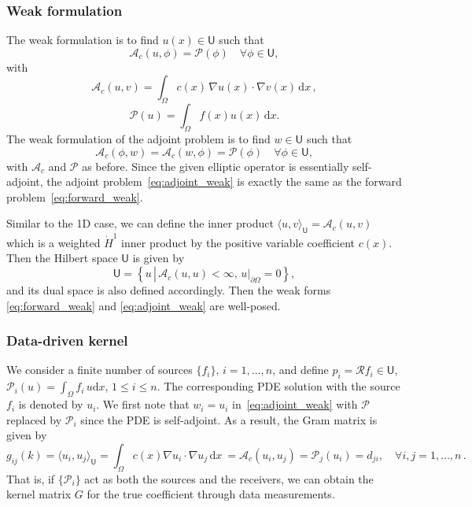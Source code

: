\documentclass[12pt]{amsart}
\newcommand{\rd}{\mathrm{d}}
\begin{document}
\subsubsection{Weak formulation}
The weak formulation is to find $u(x) \in \mathsf{U}$ such that
\begin{equation}\label{eq:forward_weak}
\mathcal{A}_c(u, \phi) = \mathcal{P}(\phi)\quad \forall \phi \in \mathsf{U},
\end{equation}
with
\[
\mathcal{A}_c(u,v) = \int_\Omega c(x)\, \nabla u(x) \cdot \nabla v(x) \,\mathrm{d}x\,,
\]
\[
\mathcal{P}(u) = \int_\Omega f(x) u(x)\, \mathrm{d}x.
\]
The weak formulation of the adjoint problem is to find $w \in \mathsf{U}$ such that
\begin{equation}\label{eq:adjoint_weak}
\mathcal{A}_c(\phi, w ) = \mathcal{A}_c ( w,\phi) = \mathcal{P}(\phi)\quad \forall \phi \in \mathsf{U},
\end{equation}
with $\mathcal{A}_c$ and $\mathcal{P}$ as before. Since the given elliptic operator is essentially self-adjoint, the adjoint problem~\eqref{eq:adjoint_weak} is exactly the same as the forward problem~\eqref{eq:forward_weak}.

Similar to the 1D case,  we can define the inner product $\langle u, v \rangle_\mathsf{U}  = \mathcal{A}_c(u,v)$ which is a weighted $\dot{H}^1$ inner product by the positive variable coefficient $c(x)$. Then the Hilbert space $\mathsf{U}$  is given by
\[
\mathsf{U} = \left\{ u \, \left|\, \mathcal{A}_c(u,u) < \infty,
\, u|_{\partial \Omega} = 0\right.\right\},
\]
and its dual space is also defined accordingly. Then the weak forms \eqref{eq:forward_weak} and \eqref{eq:adjoint_weak} are well-posed.


\subsubsection{Data-driven kernel}
We consider a finite number of sources $\{f_i\}$, $i=1,\ldots, n$, and define $p_i = \mathcal{R} f_i \in \mathsf{U}$, $\mathcal{P}_i(u) = \int_\Omega f_i \, u \rd x $, $1\leq i\leq n$. The corresponding PDE solution with the source $f_i$ is denoted by $u_i$. We first note that $w_i = u_i$ in~\eqref{eq:adjoint_weak} with $\mathcal{P}$ replaced by $\mathcal{P}_i$ since the PDE is self-adjoint. As a result, the Gram matrix is given by
\begin{equation}\label{eq:2d_poisson_kernel}
g_{ij}(k) = \langle u_i, u_j\rangle_{\mathsf{U}} = \int_\Omega c(x) \nabla u_i \cdot \nabla u_j  \,  \mathrm{d}x\ = \mathcal{A}_c(u_i,u_j) = \mathcal{P}_j(u_i) = d_{ji},\quad \forall i,j = 1,\ldots, n\,.
\end{equation}
That is, if $\{\mathcal{P}_i\}$ act as both the sources and the receivers, we can obtain the kernel matrix $G$ for the true coefficient through data measurements.
\end{document}
